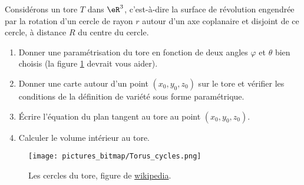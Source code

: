 
\begin{exercice}\label{exoTP20090003}


Considérons un tore $T$ dans $\eR^3$, c’est-à-dire la surface de révolution engendrée par la rotation d’un cercle de rayon $r$ autour d’un axe coplanaire et disjoint de ce cercle, à distance $R$ du centre du cercle.
\begin{enumerate}

	\item
		Donner une paramétrisation du tore en fonction de deux angles $\varphi$ et $\theta$ bien choisis (la figure \ref{FigToreWiki} devrait vous aider).
	\item
		Donner une carte autour d’un point $(x_0 , y_0 , z_0 )$ sur le tore et vérifier les conditions de la définition de variété sous forme paramétrique.
	\item
		Écrire l'équation du plan tangent au tore au point $(x_0 , y_0 , z_0 )$.
	\item
		Calculer le volume intérieur au tore.

\end{enumerate}

\begin{figure}
	\texttt{[image: pictures\_bitmap/Torus\_cycles.png]}
	\caption{Les cercles du tore, figure de \href{http://fr.wikipedia.org/wiki/Tore}{wikipedia}.}\label{FigToreWiki}
\end{figure}

\end{exercice}
